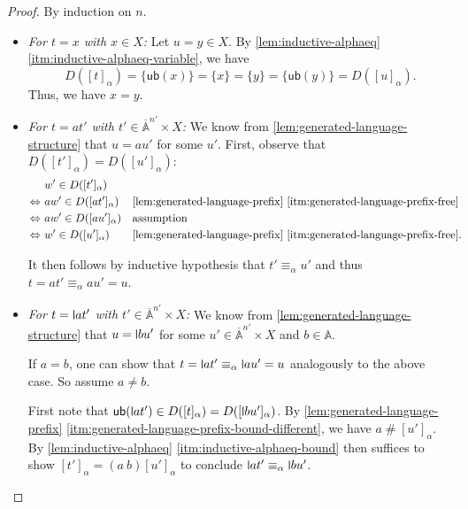 \documentclass[a4paper,UKenglish,cleveref,thm-restate,numberwithinsect,final]{lipics-v2021}
\newcommand{\Names}{\mathbb{A}}
\newcommand{\barNames}{\overline{\Names}}
\newcommand{\alphaeq}{\equiv_\alpha}
\newcommand{\fresh}{\mathbin{\#}}
\theoremstyle{plain}
\newcommand{\midmid}{\hspace{0.2ex}{\rule[-0.1ex]{0.6pt}{1.65ex}}\hspace{0.2ex}}
\newcommand{\newletter}[1]{{\midmid}#1}
\newcommand{\ub}{\mathsf{ub}}
\numberwithin{equation}{section}
\newcommand{\+}[1]{\mathcal{#1}\xspace}
\theoremstyle{definition}
\begin{document}
\begin{proof}
  By induction on \(n\).
  \begin{itemize}
      \item \textit{For \(t = x\) with \(x \in X\):}
        Let \(u = y \in X\).
        By \cref{lem:inductive-alphaeq} \eqref{itm:inductive-alphaeq-variable}, we have
        \begin{equation*}
          D([t]_\alpha) = \{\ub(x)\} = \{x\} = \{y\} = \{\ub(y)\} = D([u]_\alpha).
        \end{equation*}
        Thus, we have \(x = y\).
      \item \textit{For \(t = at'\) with \(t' \in \barNames^{n'} \times X\):}
        We know from \cref{lem:generated-language-structure} that \(u = au'\) for some \(u'\).
        First, observe that \(D([t']_\alpha) = D([u']_\alpha)\):
        \begin{align*}
          &w' \in D([t']_\alpha) \\
          \Leftrightarrow~&aw' \in D([at']_\alpha) && \text{\cref{lem:generated-language-prefix} \eqref{itm:generated-language-prefix-free}} \\
          \Leftrightarrow~&aw' \in D([au']_\alpha) && \text{assumption} \\
          \Leftrightarrow~&w' \in D([u']_\alpha) && \text{\cref{lem:generated-language-prefix} \eqref{itm:generated-language-prefix-free}}.
        \end{align*}

        It then follows by inductive hypothesis that \(t' \alphaeq u'\) and thus \(t = at' \alphaeq au' = u\).
      \item \textit{For \(t = \newletter{a}t'\) with \(t' \in \barNames^{n'} \times X\):}
        We know from \cref{lem:generated-language-structure} that \(u = \newletter{b}u'\) for some \(u' \in \barNames^{n'} \times X\) and \(b \in \Names\).

        If \(a = b\), one can show that \(t = \newletter{a}t' \alphaeq \newletter{a}u' = u\) analogously to the above case.
        So assume \(a \neq b\).

        First note that \(\ub(\newletter{a}t') \in D([t]_\alpha) = D([\newletter{b}u']_\alpha)\).
        By \cref{lem:generated-language-prefix} \eqref{itm:generated-language-prefix-bound-different}, we have \(a \fresh [u']_\alpha\).
        By \cref{lem:inductive-alphaeq} \eqref{itm:inductive-alphaeq-bound} then suffices to show \([t']_\alpha = (a\ b) [u']_\alpha\) to conclude \(\newletter{a}t' \alphaeq \newletter{b}u'\).


\end{itemize}
\end{proof}
\end{document}
